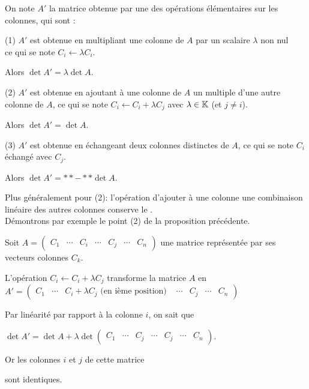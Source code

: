 \change
On note $A'$ la matrice obtenue par une des opérations élémentaires sur les colonnes, qui sont :

\change
(1) $A'$ est obtenue en multipliant une colonne de $A$ par un scalaire $\lambda$ non nul \\
ce qui se note $C_i \leftarrow \lambda C_i$. 
  
\change
Alors $\det A' = \lambda \det A$.
  
\change
(2) $A'$ est obtenue en ajoutant à une colonne de $A$ un multiple d'une autre colonne de $A$,
ce qui se note $C_i \leftarrow C_i+\lambda C_j$ avec $\lambda \in \mathbb{K}$ (et $j\neq i$).

\change
Alors $\det A' = \det A$.
  
\change
(3) $A'$ est obtenue en échangeant deux colonnes distinctes de $A$, ce qui se note 
$C_i$ échangé avec $C_j$.

\change
Alors $\det A' = **-** \det A$.

\change
Plus généralement pour (2): l'opération d'ajouter à une colonne une combinaison linéaire 
des autres colonnes con\-serve le \deter.\\


\diapo
Démontrons par exemple le point (2) de la proposition précédente.

\change
Soit $A=\begin{pmatrix}
C_1&\cdots&C_i&\cdots&C_j&\cdots&C_n
\end{pmatrix}$ une matrice représentée par ses vecteurs colonnes $C_k$. 

\change
L'opération $C_i \leftarrow C_i+\lambda C_j$ transforme la matrice $A$ en 
$A'=\begin{pmatrix}
C_1&\cdots&\displaystyle C_i+\lambda C_j \text{ (en ième position) }
&\cdots&C_j&\cdots&C_n\end{pmatrix}$

\change
Par linéarité par rapport à la colonne $i$, on sait que 

$\det A'=\det A+\lambda \det \begin{pmatrix} C_1&\cdots&C_j&\cdots&C_j&\cdots&C_n
\end{pmatrix}.$

\change
Or les colonnes $i$ et $j$ de cette matrice 

sont identiques.

